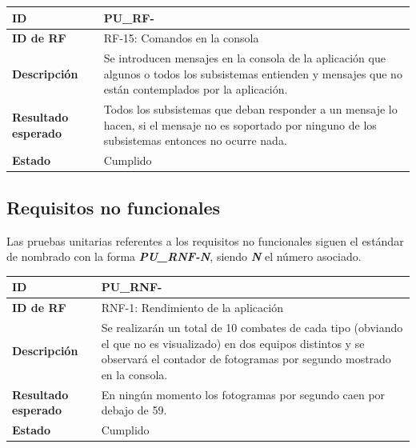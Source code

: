 \begin{center}
	\begin{tabular}{ | p{3cm} | p{10cm} | } 
		\hline
		
		\textbf{ID} & PU\_RF-\arabic{contador_pruebas_funcionales}
		{contador_pruebas_funcionales} \\
		
		\hline 
		\textbf{ID de RF} &
		RF-15: Comandos en la consola\\ 
		
		\hline
		\textbf{Descripción} & 
		Se introducen mensajes en la consola de la aplicación que algunos o todos los subsistemas entienden y mensajes que no están contemplados por la aplicación.\\
		
		\hline 
		\textbf{Resultado esperado} &
		Todos los subsistemas que deban responder a un mensaje lo hacen, si el mensaje no es soportado por ninguno de los subsistemas entonces no ocurre nada.\\ 
		
		\hline 
		\textbf{Estado} &
		Cumplido\\ 
		
		\hline
	\end{tabular}
\end{center}



\subsection{Requisitos no funcionales}

Las pruebas unitarias referentes a los requisitos no funcionales siguen el estándar de nombrado con la forma \textit{\textbf{PU\_RNF-N}}, siendo \textbf{\textit{N}} el número asociado.

\setcounter{contador_pruebas_no_funcionales}{1}

\begin{center}
	\begin{tabular}{ | p{3cm} | p{10cm} | } 
		\hline
		
		\textbf{ID} & PU\_RNF-\arabic{contador_pruebas_no_funcionales}
		{contador_pruebas_no_funcionales} \\
		
		\hline 
		\textbf{ID de RF} &
		RNF-1: Rendimiento de la aplicación\\ 
		
		\hline
		\textbf{Descripción} & 
		Se realizarán un total de 10 combates de cada tipo (obviando el que no es visualizado) en dos equipos distintos y se observará el contador de fotogramas por segundo mostrado en la consola.\\
		
		\hline 
		\textbf{Resultado esperado} &
		En ningún momento los fotogramas por segundo caen por debajo de 59.\\
		
		\hline 
		\textbf{Estado} &
		Cumplido\\ 
		
		\hline
	\end{tabular}
\end{center}

